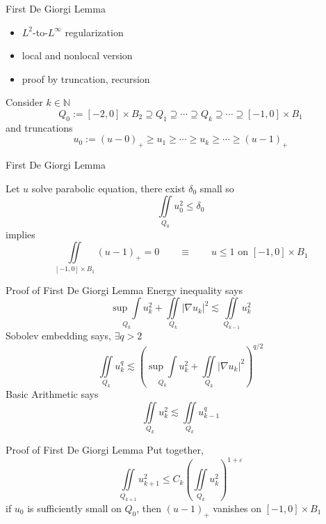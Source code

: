 \documentclass{beamer}
\newcommand{\N}{\mathbb{N}}
\newcommand{\eps}{\varepsilon}
\newcommand{\paren}[1]{\left( #1 \right)}
\newcommand{\grad}{\nabla}
\begin{document}
\begin{frame}{First De Giorgi Lemma}
\begin{itemize}
\item $L^2$-to-$L^\infty$ regularization
\item local and nonlocal version
\item proof by truncation, recursion
\end{itemize}

Consider $k \in \N$
\[ Q_0 := [-2,0]\times B_2 \supseteq Q_1 \supseteq \cdots \supseteq Q_k \supseteq \cdots \supseteq [-1,0]\times B_1 \]
and truncations
\[ u_0 := (u-0)_+ \geq u_1 \geq \cdots \geq u_k \geq \cdots \geq (u-1)_+ \]

\end{frame}


\begin{frame}{First De Giorgi Lemma}
\begin{lemma}
Let $u$ solve parabolic equation, there exist $\delta_0$ small so
\[ \iint\limits_{Q_0} u_0^2 \leq \delta_0 \]
implies 
\[ \iint\limits_{[-1,0]\times B_1} (u-1)_+ = 0 \qquad \equiv \qquad u \leq 1 \textrm{ on } [-1,0]\times B_1 \]
\end{lemma}

\end{frame}


\begin{frame}{Proof of First De Giorgi Lemma}
Energy inequality says
\[ \underset{Q_k}{\sup \int} u_k^2 + \iint\limits_{Q_k} |\grad u_k|^2 \lesssim \iint\limits_{Q_{k-1}} u_k^2 \]
\pause
Sobolev embedding says, $\exists q > 2$
\[ \iint\limits_{Q_k} u_k^q \lesssim \paren{ \underset{Q_k}{\sup \int} u_k^2 + \iint\limits_{Q_k} |\grad u_k|^2 }^{q/2} \]
\pause
Basic Arithmetic says
\[ \iint\limits_{Q_k} u_k^2 \lesssim \iint\limits_{Q_k} u_{k-1}^q \]

\end{frame}


\begin{frame}{Proof of First De Giorgi Lemma}
Put together, 
\[ \iint\limits_{Q_{k+1}} u_{k+1}^2 \leq C_k \paren{ \iint\limits_{Q_k} u_k^2 }^{1+\eps} \]
if $u_0$ is sufficiently small on $Q_0$, then $(u-1)_+$ vanishes on $[-1,0]\times B_1$
\end{frame}
\end{document}
